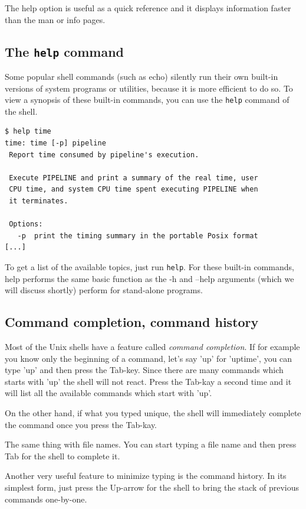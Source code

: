 \documentclass[11pt,a4paper,twoside]{article}
\begin{document}
The help option is useful as a quick reference and it displays 
information faster than the man or info pages.


\subsection{The  \texttt{help} command}
Some popular shell commands (such as echo) silently run their own built-in 
versions of system programs or utilities, because it is more efficient to do 
so. To view a synopsis of these built-in commands, you can use the 
\texttt{help} command of the shell.

\begin{lstlisting}[frame=single]
$ help time
time: time [-p] pipeline
 Report time consumed by pipeline's execution.
    
 Execute PIPELINE and print a summary of the real time, user 
 CPU time, and system CPU time spent executing PIPELINE when 
 it terminates.
    
 Options:
   -p  print the timing summary in the portable Posix format
[...]
\end{lstlisting}

To get a list of the available topics, just run \texttt{help}. For these 
built-in commands, help performs the same basic function as the -h and 
--help arguments (which we will discuss shortly) perform for
stand-alone programs.


\subsection{Command completion, command history}

Most of the Unix shells have a feature called \emph{command completion}.
If for example you know only the beginning of a command, let's say 'up' 
for 'uptime', you can type 'up' and then press the Tab-key. Since there 
are many commands which starts with 'up' the shell will not react. Press 
the Tab-kay a second time and it will list all the available commands 
which start with 'up'.

On the other hand, if what you typed unique, the shell will immediately
complete the command once you press the Tab-kay.

The same thing with file names. You can start typing a file name and
then press Tab for the shell to complete it.

Another very useful feature to minimize typing is the command history.
In its simplest form, just press the Up-arrow for the shell to bring
the stack of previous commands one-by-one.
\end{document}
